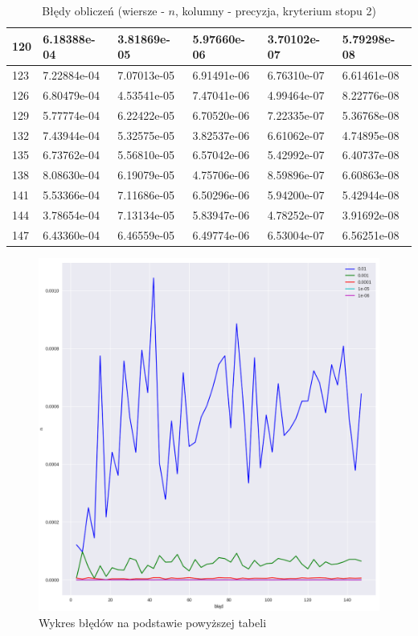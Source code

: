 \documentclass{article}
\begin{document}
\begin{table}[H]
\begin{tabular}{|l|l|l|l|l|l|}
120 & 6.18388e-04 & 3.81869e-05 & 5.97660e-06 & 3.70102e-07 & 5.79298e-08 \\ \hline
123 & 7.22884e-04 & 7.07013e-05 & 6.91491e-06 & 6.76310e-07 & 6.61461e-08 \\ \hline
126 & 6.80479e-04 & 4.53541e-05 & 7.47041e-06 & 4.99464e-07 & 8.22776e-08 \\ \hline
129 & 5.77774e-04 & 6.22422e-05 & 6.70520e-06 & 7.22335e-07 & 5.36768e-08 \\ \hline
132 & 7.43944e-04 & 5.32575e-05 & 3.82537e-06 & 6.61062e-07 & 4.74895e-08 \\ \hline
135 & 6.73762e-04 & 5.56810e-05 & 6.57042e-06 & 5.42992e-07 & 6.40737e-08 \\ \hline
138 & 8.08630e-04 & 6.19079e-05 & 4.75706e-06 & 8.59896e-07 & 6.60863e-08 \\ \hline
141 & 5.53366e-04 & 7.11686e-05 & 6.50296e-06 & 5.94200e-07 & 5.42944e-08 \\ \hline
144 & 3.78654e-04 & 7.13134e-05 & 5.83947e-06 & 4.78252e-07 & 3.91692e-08 \\ \hline
147 & 6.43360e-04 & 6.46559e-05 & 6.49774e-06 & 6.53004e-07 & 6.56251e-08 \\ \hline
\end{tabular}
\caption{Błędy obliczeń (wiersze - $n$, kolumny - precyzja, kryterium stopu 2)}
\end{table}

\begin{figure}[H]
    \centering
    \includegraphics[width=\textwidth]{img/plot_2.png}
    \caption{Wykres błędów na podstawie powyższej tabeli}
\end{figure}
\end{document}
